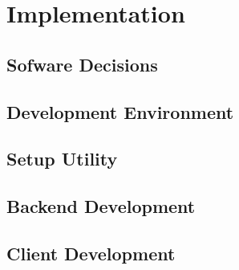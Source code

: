 \chapter{Implementation}

\section{Sofware Decisions}



\section{Development Environment}



\section{Setup Utility}



\section{Backend Development}



\section{Client Development}


